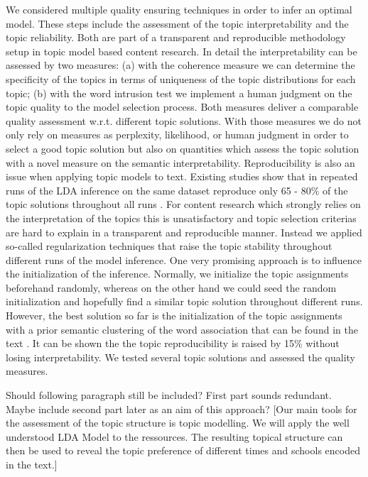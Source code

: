 \documentclass[a4paper,10pt]{article}
\newcommand{\TODO}[1]{\begingroup\color{red}#1\endgroup}
\newcommand{\NR}[1]{\begingroup\color{orange}#1\endgroup}
\begin{document}
{We considered multiple quality ensuring techniques in
order to infer an optimal model. \NR{These} steps include the assessment of the
topic interpretability and the topic reliability. Both are part of a
transparent and reproducible methodology setup in topic model based content
research.  In detail the interpretability can be assessed by two
measures\NR{: (a) w}ith the coherence measure \cite{newman:2010} we can determine the
specificity of the topics in terms of uniqueness of the topic distributions
for each topic\NR{; (b) w}ith the word intrusion test \cite{chang:2009} we implement a human
judgment on the topic quality to the model selection process. Both measures
deliver a comparable quality assessment w.r.t. different topic
solutions. With those measures we do not only rely on measures as
perplexity, likelihood, or human judgment in order to select a good topic
solution but also on quantities which assess the topic solution with a novel
measure on the semantic interpretability. Reproducibility is also an issue
when applying topic models to text. Existing studies show that in repeated
runs of the LDA inference on the same dataset reproduce only 65 - 80\% of
the topic solutions throughout all runs \cite{niekler:2012,koltcov:2016}. For content
research which strongly relies on the interpretation of the topics this is
unsatisfactory and topic selection criterias are hard to explain in a
transparent and reproducible manner. Instead we applied so-called
regularization techniques that
raise the topic stability throughout different runs of the model inference. One  very promising approach is to influence the
initialization of the inference. Normally, we initialize the topic
assignments beforehand randomly, \NR{whereas o}n the other hand we could seed the random
initialization and hopefully find a similar topic solution throughout
different runs. However, the best solution so far is the initialization of
the topic assignments with a prior semantic clustering of the word
association that can be found in the text \cite{lancichinetti:2015}. It can be
shown the the topic reproducibility is raised by 15\% without losing
interpretability. We tested several topic solutions and assessed the
quality measures. 


\TODO{Should following paragraph still be included?} \NR{First part sounds 
redundant. Maybe include second part later as an aim of this approach?}
  [Our main tools for the assessment of the topic structure is topic
  modelling.  We will apply the well understood LDA Model to
  the ressources. The resulting topical structure can then be used to
  reveal the topic preference of different times and \TODO{schools} encoded
  in the text.]


}
\end{document}
